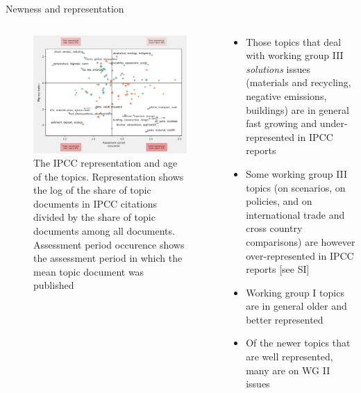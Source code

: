 \documentclass[9pt]{beamer}
\begin{document}

\begin{frame}{Newness and representation}
\begin{columns}
	\begin{column}{0.618\linewidth}
\begin{figure}[h!]
	\begin{center}
		\includegraphics[width=0.85\linewidth]{../plots/ipcc_representation/ipcc_rep_new1429_all.pdf}
		\caption{The IPCC representation and age of the topics. Representation shows the log of the share of topic documents in IPCC citations divided by the share of topic documents among all documents. Assessment period occurence shows the assessment period in which the mean topic document was published}
		\label{ipcc_rep}
	\end{center}
\end{figure}
	\end{column}
	\begin{column}{0.382\linewidth}
		\begin{itemize}
			\item<2-> Those topics that deal with working group III \textit{solutions} issues (materials and recycling, negative emissions, buildings) are in general fast growing and under-represented in IPCC reports
			\item<3-> Some working group III topics (on scenarios, on policies, and on international trade and cross country comparisons) are however over-represented in IPCC reports [see SI]
			\item<4-> Working group I topics are in general older and better represented
			\item<5-> Of the newer topics that are well represented, many are on WG II issues	
			
		\end{itemize}
	\end{column}
\end{columns}
\end{frame}
\end{document}
